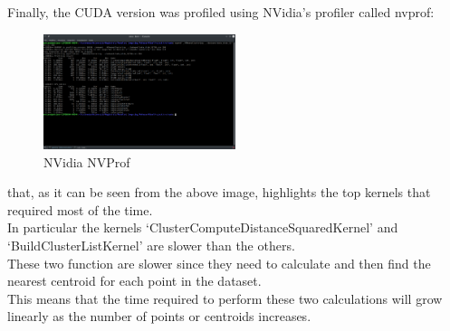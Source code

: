\documentclass[10pt,twocolumn,letterpaper]{article}
\begin{document}
Finally, the CUDA version was profiled using NVidia's profiler called nvprof:\\
\begin{figure}[H]
\centering
\includegraphics[width=0.5\textwidth]{Cuda_NVProf}
\caption{NVidia NVProf}
\end{figure}
that, as it can be seen from the above image, highlights the top kernels that required most of the time.\\
In particular the kernels `ClusterComputeDistanceSquaredKernel' and `BuildClusterListKernel' are slower than the others.\\
These two function are slower since they need to calculate and then find the nearest centroid for each point in the dataset.\\
This means that the time required to perform these two calculations will grow linearly as the number of points or centroids 
increases.
\end{document}
